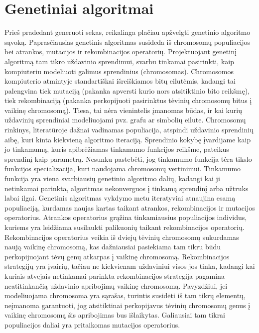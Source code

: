 \documentclass{VUMIFInfKursinis}
\begin{document}
\section{Genetiniai algoritmai}

Prieš pradedant generuoti sekas, reikalinga plačiau apžvelgti genetinio algoritmo sąvoką.
Paprasčiausias genetinis algoritmas susideda iš chromosomų populiacijos bei atrankos, mutacijos ir rekombinacijos operatorių.
Projektuojant genetinį algoritmą tam tikro uždavinio sprendimui, svarbu tinkamai pasirinkti,
kaip kompiuteriu modeliuoti galimus sprendinius (chromosomas).
Chromosomos kompiuterio atmintyje standartiškai išreiškiamos bitų eilutėmis,
kadangi tai palengvina tiek mutaciją (pakanka apversti kurio nors atsitiktinio bito reikšmę),
tiek rekombinaciją (pakanka perkopijuoti pasirinktus tėvinių chromosomų bitus į vaikinę chromosomą).
Tiesa, tai nėra vienintelis įmanomas būdas, ir kai kurių uždavinių sprendiniai modeliuojami pvz. grafu ar simbolių eilute.
Chromosomų rinkinys, literatūroje dažnai vadinamas populiacija, atspindi uždavinio sprendinių aibę, kuri kinta kiekvieną algoritmo iteraciją.
Sprendinio kokybę įvardijame kaip jo tinkamumą, kuris apibrėžiamas tinkamumo funkcijos reikšme, pateikus sprendinį kaip parametrą.
Nesunku pastebėti, jog tinkamumo funkcija tėra tikslo funkcijos specializacija, kuri naudojama chromosomų vertinimui.
Tinkamumo funkcija yra viena svarbiausių genetinio algoritmo dalių,
kadangi kai ji netinkamai parinkta, algoritmas nekonverguos į tinkamą sprendinį arba užtruks labai ilgai.  
Genetinis algoritmas vykdymo metu iteratyviai atnaujina esamą populiaciją, kurdamas naujas kartas taikant atrankos, rekombinacijos ir mutacijos operatorius.
Atrankos operatorius grąžina tinkamiausius populiacijos individus, kuriems yra leidžiama susilaukti palikuonių taikant rekombinacijos operatorių.
Rekombinacijos operatorius veikia iš dviejų tėvinių chromosomų sukurdamas naują vaikinę chromosomą, kas dažniausiai pasiekiama
tam tikru būdu perkopijuojant tėvų genų atkarpas į vaikinę chromosomą.
Rekombinacijos strategijų yra įvairių, tačiau ne kiekvienam uždaviniui visos jos tinka, kadangi
kai kuriais atvejais netinkamai parinkta rekombinacijos strategija pagamina neatitinkančią uždavinio apribojimų vaikinę chromosomą.
Pavyzdžiui, jei modeliuojama chromosoma yra sąrašas, turintis susidėti iš tam tikrų elementų, neįmanoma garantuoti, jog atsitiktinai
perkopijavus tėvinių chromosomų genus į vaikinę chromosomą šis apribojimas bus išlaikytas.
Galiausiai tam tikrai populiacijos daliai yra pritaikomas mutacijos operatorius.
\end{document}
